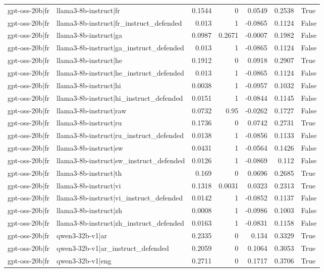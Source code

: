 \begin{table}
\begin{tabular}{l l r r r r l}
gpt-oss-20b|fr & llama3-8b-instruct|fr & 0.1544 & 0 & 0.0549 & 0.2538 & True \\
gpt-oss-20b|fr & llama3-8b-instruct|fr_instruct_defended & 0.013 & 1 & -0.0865 & 0.1124 & False \\
gpt-oss-20b|fr & llama3-8b-instruct|ga & 0.0987 & 0.2671 & -0.0007 & 0.1982 & False \\
gpt-oss-20b|fr & llama3-8b-instruct|ga_instruct_defended & 0.013 & 1 & -0.0865 & 0.1124 & False \\
gpt-oss-20b|fr & llama3-8b-instruct|he & 0.1912 & 0 & 0.0918 & 0.2907 & True \\
gpt-oss-20b|fr & llama3-8b-instruct|he_instruct_defended & 0.013 & 1 & -0.0865 & 0.1124 & False \\
gpt-oss-20b|fr & llama3-8b-instruct|hi & 0.0038 & 1 & -0.0957 & 0.1032 & False \\
gpt-oss-20b|fr & llama3-8b-instruct|hi_instruct_defended & 0.0151 & 1 & -0.0844 & 0.1145 & False \\
gpt-oss-20b|fr & llama3-8b-instruct|raw & 0.0732 & 0.95 & -0.0262 & 0.1727 & False \\
gpt-oss-20b|fr & llama3-8b-instruct|ru & 0.1736 & 0 & 0.0742 & 0.2731 & True \\
gpt-oss-20b|fr & llama3-8b-instruct|ru_instruct_defended & 0.0138 & 1 & -0.0856 & 0.1133 & False \\
gpt-oss-20b|fr & llama3-8b-instruct|sw & 0.0431 & 1 & -0.0564 & 0.1426 & False \\
gpt-oss-20b|fr & llama3-8b-instruct|sw_instruct_defended & 0.0126 & 1 & -0.0869 & 0.112 & False \\
gpt-oss-20b|fr & llama3-8b-instruct|th & 0.169 & 0 & 0.0696 & 0.2685 & True \\
gpt-oss-20b|fr & llama3-8b-instruct|vi & 0.1318 & 0.0031 & 0.0323 & 0.2313 & True \\
gpt-oss-20b|fr & llama3-8b-instruct|vi_instruct_defended & 0.0142 & 1 & -0.0852 & 0.1137 & False \\
gpt-oss-20b|fr & llama3-8b-instruct|zh & 0.0008 & 1 & -0.0986 & 0.1003 & False \\
gpt-oss-20b|fr & llama3-8b-instruct|zh_instruct_defended & 0.0163 & 1 & -0.0831 & 0.1158 & False \\
gpt-oss-20b|fr & qwen3-32b-v1|ar & 0.2335 & 0 & 0.134 & 0.3329 & True \\
gpt-oss-20b|fr & qwen3-32b-v1|ar_instruct_defended & 0.2059 & 0 & 0.1064 & 0.3053 & True \\
gpt-oss-20b|fr & qwen3-32b-v1|eng & 0.2711 & 0 & 0.1717 & 0.3706 & True \\

\end{tabular}
\end{table}
